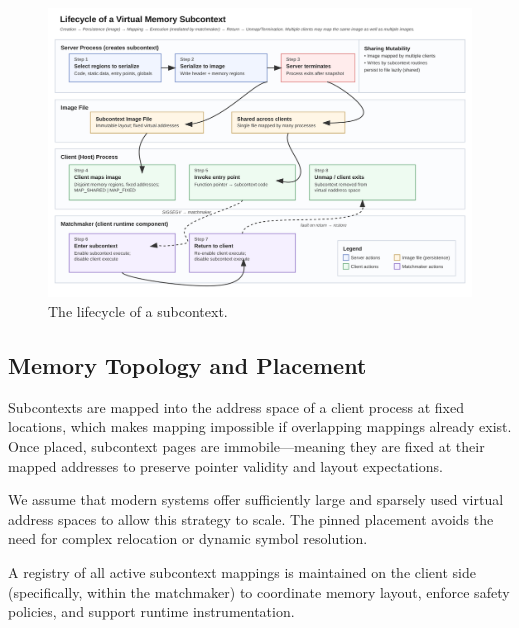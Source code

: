 \begin{figure}[ht]
    \centering
    \includegraphics[width=\textwidth]{subcontext_lifecycle.png}
    \caption{The lifecycle of a subcontext.}
\end{figure}


\subsection*{Memory Topology and Placement}
Subcontexts are mapped into the address space of a client process at fixed locations, which makes mapping impossible if overlapping mappings already exist. Once placed, subcontext pages are immobile—meaning they are fixed at their mapped addresses to preserve pointer validity and layout expectations.

We assume that modern systems offer sufficiently large and sparsely used virtual address spaces to allow this strategy to scale. The pinned placement avoids the need for complex relocation or dynamic symbol resolution.

A registry of all active subcontext mappings is maintained on the client side (specifically, within the matchmaker) to coordinate memory layout, enforce safety policies, and support runtime instrumentation.

